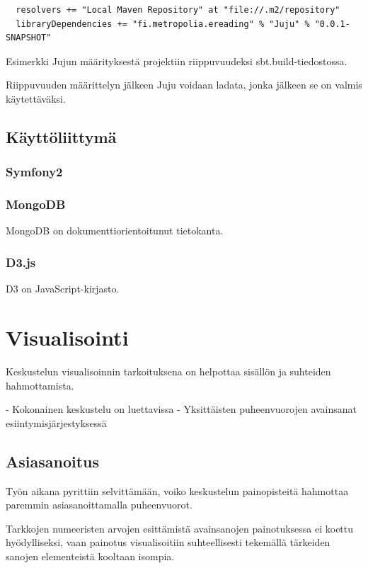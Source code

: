 \documentclass[11pt,a4paper,oneside]{memoir}
\begin{document}
\begin{program}
  \begin{verbatim}
  resolvers += "Local Maven Repository" at "file://.m2/repository"
  libraryDependencies += "fi.metropolia.ereading" % "Juju" % "0.0.1-SNAPSHOT"
  \end{verbatim}
  \caption{Esimerkki Jujun määrityksestä projektiin riippuvuudeksi sbt.build-tiedostossa.}
\end{program}

Riippuvuuden määrittelyn jälkeen Juju voidaan ladata, jonka jälkeen se on valmis käytettäväksi.

\section{Käyttöliittymä}

\subsection{Symfony2}

\subsection{MongoDB}
MongoDB on dokumenttiorientoitunut tietokanta. 

\subsection{D3.js}
D3 on JavaScript-kirjasto.

\chapter{Visualisointi}
Keskustelun visualisoinnin tarkoituksena on helpottaa sisällön ja suhteiden hahmottamista.

- Kokonainen keskustelu on luettavissa
- Yksittäisten puheenvuorojen avainsanat esiintymisjärjestyksessä

\section{Asiasanoitus}
Työn aikana pyrittiin selvittämään, voiko keskustelun painopisteitä hahmottaa paremmin asiasanoittamalla puheenvuorot. 

Tarkkojen numeeristen arvojen esittämistä avainsanojen painotuksessa ei koettu hyödylliseksi, vaan painotus visualisoitiin suhteellisesti tekemällä tärkeiden sanojen elementeistä kooltaan isompia.
\end{document}
